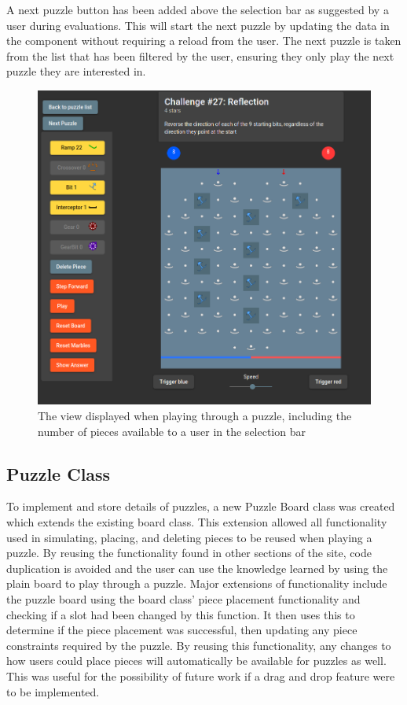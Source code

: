 \documentclass{l4proj}
\begin{document}
A next puzzle button has been added above the selection bar as suggested by a user during evaluations. This will start the next puzzle by updating the data in the component without requiring a reload from the user. The next puzzle is taken from the list that has been filtered by the user, ensuring they only play the next puzzle they are interested in.

\begin{figure}
    \centering
    \includegraphics[width=0.65\linewidth]{images/puzzle.png}
    \caption{The view displayed when playing through a puzzle, including the number of pieces available to a user in the selection bar}
    \label{fig:puzzle}
\end{figure}

\subsection{Puzzle Class}
To implement and store details of puzzles, a new Puzzle Board class was created which extends the existing board class. This extension allowed all functionality used in simulating, placing, and deleting pieces to be reused when playing a puzzle. By reusing the functionality found in other sections of the site, code duplication is avoided and the user can use the knowledge learned by using the plain board to play through a puzzle. Major extensions of functionality include the puzzle board using the board class' piece placement functionality and checking if a slot had been changed by this function. It then uses this to determine if the piece placement was successful, then updating any piece constraints required by the puzzle. By reusing this functionality, any changes to how users could place pieces will automatically be available for puzzles as well. This was useful for the possibility of future work if a drag and drop feature were to be implemented. 
\end{document}
